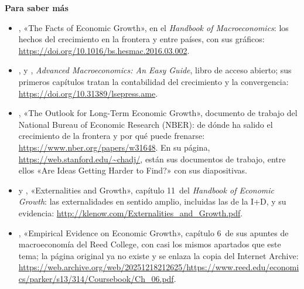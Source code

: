 \documentclass[11pt]{article}
\begin{document}
\begin{anotaciones}
\textbf{Para saber más}
\begin{itemize}
\item {}, «The Facts of Economic Growth», en el \emph{Handbook of Macroeconomics}: los hechos del crecimiento en la frontera y entre países, con sus gráficos: \url{https://doi.org/10.1016/bs.hesmac.2016.03.002}\nocite{Jones2016}.
\item {},  y , \emph{Advanced Macroeconomics: An Easy Guide}, libro de acceso abierto; sus primeros capítulos tratan la contabilidad del crecimiento y la convergencia: \url{https://doi.org/10.31389/lsepress.ame}\nocite{Campante2021}.
\item {}, «The Outlook for Long-Term Economic Growth», documento de trabajo del National Bureau of Economic Research (NBER): de dónde ha salido el crecimiento de la frontera y por qué puede frenarse: \url{https://www.nber.org/papers/w31648}\nocite{Jones2023}. En su página, \url{https://web.stanford.edu/~chadj/}, están sus documentos de trabajo, entre ellos «Are Ideas Getting Harder to Find?» con sus diapositivas.
\item {} y , «Externalities and Growth», capítulo 11~del \emph{Handbook of Economic Growth}: las externalidades en sentido amplio, incluidas las de la I+D, y su evidencia: \url{http://klenow.com/Externalities_and_Growth.pdf}\nocite{KlenowRodriguezClare2005Externalities}.
\item {}, «Empirical Evidence on Economic Growth», capítulo 6~de sus apuntes de macroeconomía del Reed College, con casi los mismos apartados que este tema; la página original ya no existe y se enlaza la copia del Internet Archive: \url{https://web.archive.org/web/20251218212625/https://www.reed.edu/economics/parker/s13/314/Coursebook/Ch_06.pdf}\nocite{Parker2012Empirical}.
\end{itemize}
\end{anotaciones}
\end{document}
